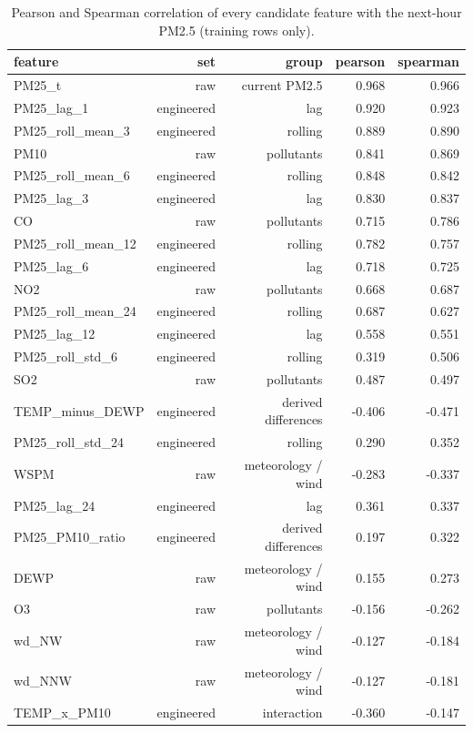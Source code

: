 \begin{table}[t]
\centering
\small
\caption{Pearson and Spearman correlation of every candidate feature with the next-hour PM2.5 (training rows only).}
\label{tab:table_S03_feature_target_association}
\begin{tabular}{lrrrr}
\toprule
feature & set & group & pearson & spearman \\
\midrule
PM25\_t & raw & current PM2.5 & 0.968 & 0.966 \\
PM25\_lag\_1 & engineered & lag & 0.920 & 0.923 \\
PM25\_roll\_mean\_3 & engineered & rolling & 0.889 & 0.890 \\
PM10 & raw & pollutants & 0.841 & 0.869 \\
PM25\_roll\_mean\_6 & engineered & rolling & 0.848 & 0.842 \\
PM25\_lag\_3 & engineered & lag & 0.830 & 0.837 \\
CO & raw & pollutants & 0.715 & 0.786 \\
PM25\_roll\_mean\_12 & engineered & rolling & 0.782 & 0.757 \\
PM25\_lag\_6 & engineered & lag & 0.718 & 0.725 \\
NO2 & raw & pollutants & 0.668 & 0.687 \\
PM25\_roll\_mean\_24 & engineered & rolling & 0.687 & 0.627 \\
PM25\_lag\_12 & engineered & lag & 0.558 & 0.551 \\
PM25\_roll\_std\_6 & engineered & rolling & 0.319 & 0.506 \\
SO2 & raw & pollutants & 0.487 & 0.497 \\
TEMP\_minus\_DEWP & engineered & derived differences & -0.406 & -0.471 \\
PM25\_roll\_std\_24 & engineered & rolling & 0.290 & 0.352 \\
WSPM & raw & meteorology / wind & -0.283 & -0.337 \\
PM25\_lag\_24 & engineered & lag & 0.361 & 0.337 \\
PM25\_PM10\_ratio & engineered & derived differences & 0.197 & 0.322 \\
DEWP & raw & meteorology / wind & 0.155 & 0.273 \\
O3 & raw & pollutants & -0.156 & -0.262 \\
wd\_NW & raw & meteorology / wind & -0.127 & -0.184 \\
wd\_NNW & raw & meteorology / wind & -0.127 & -0.181 \\
TEMP\_x\_PM10 & engineered & interaction & -0.360 & -0.147 \\

\end{tabular}
\end{table}
